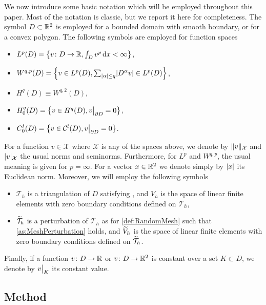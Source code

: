 \documentclass[10pt]{article}
\begin{document}
We now introduce some basic notation which will be employed throughout this paper. Most of the notation is classic, but we report it here for completeness. The symbol $D \subset \mathbb{R}^2$ is employed for a bounded domain with smooth boundary, or for a convex polygon. The following symbols are employed for function spaces
\begin{itemize}
	\item $L^p(D) = \left\{v\colon D \to \mathbb{R}, \int_D v^p \, \mathrm{d} x< \infty \right\}$,
	\item $W^{q, p}(D) = \left\{v \in L^p(D), \sum_{\lvert\alpha\rvert\leq q} \lvert D^{\alpha} v\rvert \in L^p(D) \right\}$,
	\item $H^q(D) \equiv W^{q,2}(D)$,
	\item $H^q_0(D) = \left\{v \in H^q(D), v\bigr\rvert_{\partial D} = 0\right\}$,
	\item $C^l_0(D) = \left\{v \in \mathcal C^l(D), v\bigr\rvert_{\partial D} = 0\right\}$.
\end{itemize}
For a function $v \in \mathcal X$ where $\mathcal X$ is any of the spaces above, we denote by $\lVert v\rVert_{\mathcal X}$ and $\lvert v\rvert_{\mathcal X}$ the usual norms and seminorms. Furthermore, for $L^p$ and $W^{q,p}$, the usual meaning is given for $p = \infty$. For a vector $x \in \mathbb{R}^2$ we denote simply by $\lvert x\rvert$ its Euclidean norm. Moreover, we will employ the following symbols
\begin{itemize}
	\item $\mathcal T_h$ is a triangulation of $D$ satisfying , and $V_h$ is the space of linear finite elements with zero boundary conditions defined on $\mathcal T_h$,
	\item $\widetilde{\mathcal T}_h$ is a perturbation of $\mathcal T_h$ as for \cref{def:RandomMesh} such that \cref{as:MeshPerturbation} holds, and $\widetilde V_h$ is the space of linear finite elements with zero boundary conditions defined on $\widetilde{\mathcal T}_h$.
\end{itemize}
Finally, if a function $v \colon D \to \mathbb{R}$ or $v \colon D \to \mathbb{R}^2$ is constant over a set $K \subset D$, we denote by $v\bigr\rvert_{K}$ its constant value.


\subsection{Method} 
\end{document}
